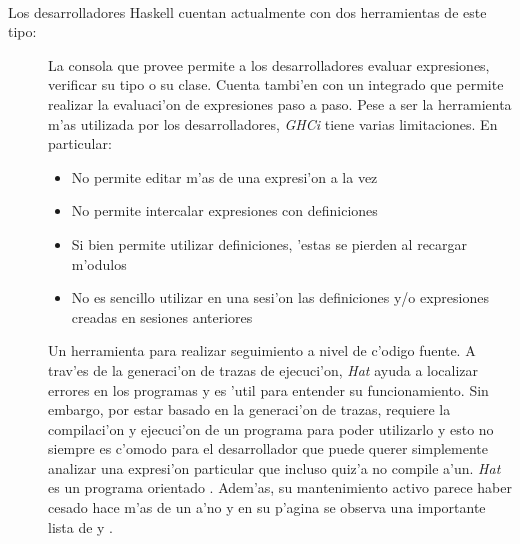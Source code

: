 \documentclass[a4paper]{article}
\begin{document}
\paragraph{}Los desarrolladores Haskell cuentan actualmente con dos herramientas de este tipo:
\begin{description}
	\item[]
		La consola que provee  permite a los desarrolladores evaluar expresiones, verificar su tipo o su clase.  Cuenta tambi'en con un  integrado que permite realizar la evaluaci'on de expresiones paso a paso.  Pese a ser la herramienta m'as utilizada por los desarrolladores, \textit{GHCi} tiene varias limitaciones.  En particular:
		\begin{itemize}
			\item No permite editar m'as de una expresi'on a la vez
			\item No permite intercalar expresiones con definiciones
			\item	Si bien permite utilizar definiciones, 'estas se pierden al recargar m'odulos
			\item No es sencillo utilizar en una sesi'on las definiciones y/o expresiones creadas en sesiones anteriores
		\end{itemize}
	\item[]
		Un herramienta para realizar seguimiento a nivel de c'odigo fuente.  A trav'es de la generaci'on de trazas de ejecuci'on, \textit{Hat} ayuda a localizar errores en los programas y es 'util para entender su funcionamiento.  Sin embargo, por estar basado en la generaci'on de trazas, requiere la compilaci'on y ejecuci'on de un programa para poder utilizarlo y esto no siempre es c'omodo para el desarrollador que puede querer simplemente analizar una expresi'on particular que incluso quiz'a no compile a'un.  \textit{Hat} es un programa orientado .  Adem'as, su mantenimiento activo parece haber cesado hace m'as de un a'no y en su p'agina se observa una importante lista de  y .  
\end{description}
\end{document}

